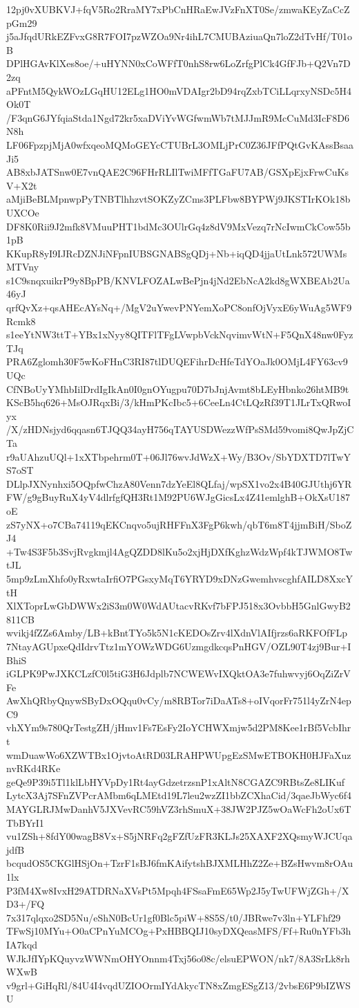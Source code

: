 12pj0vXUBKVJ+fqV5Ro2RraMY7xPbCnHRaEwJVzFnXT0Se/zmwaKEyZaCcZpGm29
j5aJfqdURkEZFvxG8R7FOI7pzWZOa9Nr4ihL7CMUBAziuaQn7loZ2dTvHf/T01oB
DPlHGAvKlXes8oe/+uHYNN0xCoWFfT0nhS8rw6LoZrfgPlCk4GfFJb+Q2Vn7D2zq
aPFntM5QykWOzLGqHU12ELg1HO0mVDAIgr2bD94rqZxbTCiLLqrxyNSDc5H4Ok0T
/F3qnG6JYfqiaStda1Ngd72kr5xaDViYvWGfwmWb7tMJJmR9McCuMd3IcF8D6N8h
LF06FpzpjMjA0wfxqeoMQMoGEYcCTUBrL3OMLjPrC0Z36JFfPQtGvKAssBsaaJi5
AB8xbJATSnw0E7vnQAE2C96FHrRLIlTwiMFfTGaFU7AB/GSXpEjxFrwCuKsV+X2t
aMjiBeBLMpnwpPyTNBTlhhzvtSOKZyZCms3PLFbw8BYPWj9JKSTIrKOk18bUXCOe
DF8K0Rii9J2mfk8VMuuPHT1bdMc3OUlrGq4z8dV9MxVezq7rNcIwmCkCow55b1pB
KKupR8yI9IJRcDZNJiNFpnIUBSGNABSgQDj+Nb+iqQD4jjaUtLnk572UWMsMTVny
s1C9snqxuikrP9y8BpPB/KNVLFOZALwBePjn4jNd2EbNcA2kd8gWXBEAb2Ua46yJ
qrfQvXz+qsAHEcAYsNq+/MgV2uYwevPNYemXoPC8onfOjVyxE6yWuAg5WF9Rcmk8
s1eeYtNW3ttT+YBx1xNyy8QITFlTFgLVwpbVckNqvimvWtN+F5QnX48nw0FyzTJq
PRA6Zglomh30F5wKoFHnC3RI87tlDUQEFihrDcHfeTdYOaJk0OMjL4FY63cv9UQc
CfNBoUyYMhbIilDrdIgIkAn0I0gnOYugpu70D7bJnjAvmt8bLEyHbnko26htMB9t
KScB5hq626+MsOJRqxBi/3/kHmPKcIbc5+6CeeLn4CtLQzRf39T1JLrTxQRwoIyx
/X/zHDNsjyd6qqasn6TJQQ34ayH756qTAYUSDWezzWfPsSMd59vomi8QwJpZjCTa
r9aUAhzuUQl+1xXTbpehrm0T+06Jl76wvJdWzX+Wy/B3Ov/SbYDXTD7lTwYS7oST
DLlpJXNynhxi5OQpfwChzA80Venn7dzYeEl8QLfaj/wpSX1vo2x4B40GJUthj6YR
FW/g9gBuyRuX4yV4dlrfgfQH3Rt1M92PU6WJgGicsLx4Z41emlghB+OkXsU187oE
zS7yNX+o7CBa74119qEKCnqvo5ujRHFFnX3FgP6kwh/qbT6m8T4jjmBiH/SboZJ4
+Tw4S3F5b3SvjRvgkmjl4AgQZDD8lKu5o2xjHjDXfKghzWdzWpf4kTJWMO8TwtJL
5mp9zLmXhfo0yRxwtaIrfiO7PGsxyMqT6YRYD9xDNzGwemhvscghfAILD8XxcYtH
XlXToprLwGbDWWx2iS3m0W0WdAUtacvRKvf7bFPJ518x3OvbbH5GnlGwyB2811CB
wvikj4fZZs6Amby/LB+kBntTYo5k5N1cKEDOsZrv4lXdnVlAIfjrzs6aRKFOfFLp
7NtayAGUpxeQdIdrvTtz1mYOWzWDG6UzmgdkcqsPnHGV/OZL90T4zj9Bur+IBhiS
iGLPK9PwJXKCLzfC0l5tiG3H6Jdplb7NCWEWvIXQktOA3e7fuhwvyj6OqZiZrVFe
AwXhQRbyQnywSByDxOQqu0vCy/m8RBTor7iDaATs8+oIVqorFr751l4yZrN4epC9
vhXYm9s780QrTestgZH/jHmv1Fs7EsFy2IoYCHWXmjw5d2PM8Kee1rBf5VcbIhrt
wmDuawWo6XZWTBx1OjvtoAtRD03LRAHPWUpgEzSMwETBOKH0HJFaXuznvRKd4RKe
geQe9P39i5Tl1klLbHYVpDy1Rt4ayGdzetrzsnP1xAltN8CGAZC9RBtsZe8LIKuf
LytcX3Aj7SFnZVPcrAMbm6qLMEtd19L7leu2wzZI1bbZCXhaCid/3qaeJbWyc6f4
MAYGLRJMwDanhV5JXVevRC59hVZ3rhSmuX+38JW2PJZ5wOaWcFh2oUx6TTbBYrI1
vu1ZSh+8fdY00wagB8Vx+S5jNRFq2gFZfUzFR3KLJs25XAXF2XQsmyWJCUqajdfB
bcqudOS5CKGlHSjOn+TzrF1sBJ6fmKAifytshBJXMLHhZ2Ze+BZsHwvm8rOAu1lx
P3fM4Xw8IvxH29ATDRNaXVsPt5Mpqh4FSsaFmE65Wp2J5yTwUFWjZGh+/XD3+/FQ
7x317qlqxo2SD5Nu/eShN0BcUr1gf0Blc5piW+8S5S/t0/JBRwe7v3ln+YLFhf29
TFwSj10MYu+O0aCPnYuMCOg+PxHBBQIJ10syDXQeasMFS/Ff+Ru0nYFb3hIA7kqd
WJkJfIYpKQuyvzWWNmOHYOnnm4Txj56o08c/elsuEPWON/nk7/8A3SrLk8rhWXwB
v9grl+GiHqRl/84U4I4vqdUZIOOrmIYdAkycTN8xZmgESgZ13/2vbsE6P9bIZWSU
